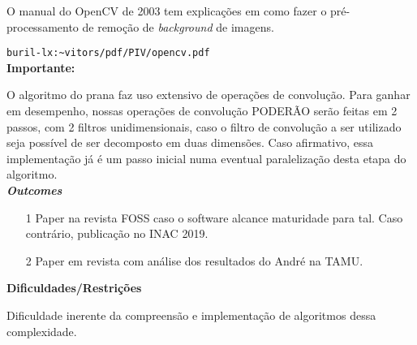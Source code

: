 O manual do OpenCV de 2003 tem explicações em como fazer o pré-processamento 
de remoção de \textit{background} de imagens. 

\texttt{buril-lx:\textasciitilde vitors/pdf/PIV/opencv.pdf}\\

\textbf{Importante:}

O algoritmo do prana faz uso extensivo de operações de convolução. Para ganhar em desempenho, nossas operações de convolução PODERÃO serão feitas em 2 passos, com 2 filtros unidimensionais, caso o filtro de convolução a ser utilizado seja possível de ser decomposto em duas dimensões. Caso afirmativo, essa implementação já é um passo inicial numa eventual paralelização desta etapa do algoritmo.\\

\textbf{\textit{Outcomes}}

\begin{itemize}
	\item[1] Paper na revista FOSS caso o software alcance maturidade para tal. Caso contrário, publicação no INAC 2019.
	\item[2] Paper em revista com análise dos resultados do André na TAMU.

\end{itemize}


\textbf{Dificuldades/Restrições}

Dificuldade inerente da compreensão e implementação de algoritmos dessa complexidade.\\

